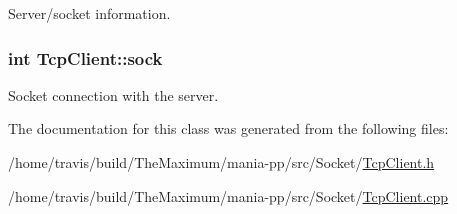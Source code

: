 Server/socket information. 

\hypertarget{classTcpClient_af93f7c8c4d91d93379ba99fd3742c3dc}{
\subsubsection[{sock}]{\setlength{\rightskip}{0pt plus 5cm}int Tcp\-Client\-::sock\hspace{0.3cm}{\ttfamily [private]}}}\label{classTcpClient_af93f7c8c4d91d93379ba99fd3742c3dc}


Socket connection with the server. 



The documentation for this class was generated from the following files\-:\begin{DoxyCompactItemize}
\item 
/home/travis/build/\-The\-Maximum/mania-\/pp/src/\-Socket/\hyperlink{TcpClient_8h}{Tcp\-Client.\-h}\item 
/home/travis/build/\-The\-Maximum/mania-\/pp/src/\-Socket/\hyperlink{TcpClient_8cpp}{Tcp\-Client.\-cpp}\end{DoxyCompactItemize}
